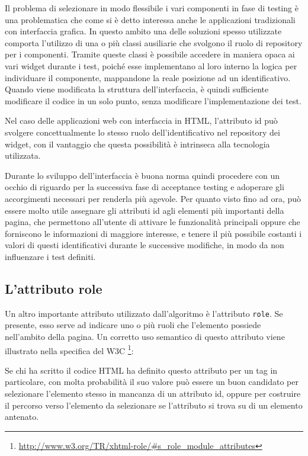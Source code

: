 Il problema di selezionare in modo flessibile i vari componenti in fase di testing è una problematica che come si è detto interessa anche le applicazioni tradizionali con interfaccia grafica. In questo ambito una delle soluzioni spesso utilizzate comporta l'utilizzo di una o più classi ausiliarie che svolgono il ruolo di repository per i componenti. Tramite queste classi è possibile accedere in maniera opaca ai vari widget durante i test, poiché esse implementano al loro interno la logica per individuare il componente, mappandone la reale posizione ad un identificativo. Quando viene modificata la struttura dell'interfaccia, è quindi sufficiente modificare il codice in un solo punto, senza modificare l'implementazione dei test.

Nel caso delle applicazioni web con interfaccia in HTML, l'attributo id può svolgere concettualmente lo stesso ruolo dell'identificativo nel repository dei widget, con il vantaggio che questa possibilità è intrinseca alla tecnologia utilizzata.

Durante lo sviluppo dell'interfaccia è buona norma quindi procedere con un occhio di riguardo per la successiva fase di acceptance testing e adoperare gli accorgimenti necessari per renderla più agevole. Per quanto visto fino ad ora, può essere molto utile assegnare gli attributi id agli elementi più importanti della pagina, che permettono all'utente di attivare le funzionalità principali oppure che forniscono le informazioni di maggiore interesse, e tenere il più possibile costanti i valori di questi identificativi durante le successive modifiche, in modo da non influenzare i test definiti.

\subsection {L'attributo role}

Un altro importante attributo utilizzato dall'algoritmo è l'attributo \verb|role|. Se presente, esso serve ad indicare uno o più ruoli che l'elemento possiede nell'ambito della pagina. Un corretto uso semantico di questo attributo viene illustrato nella specifica del W3C \footnote{\url{http://www.w3.org/TR/xhtml-role/\#s_role_module_attributes}}:



Se chi ha scritto il codice HTML ha definito questo attributo per un tag in particolare, con molta probabilità il suo valore può essere un buon candidato per selezionare l'elemento stesso in mancanza di un attributo id, oppure per costruire il percorso verso l'elemento da selezionare se l'attributo si trova su di un elemento antenato. 

